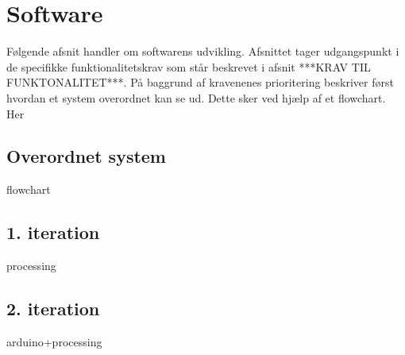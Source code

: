 \chapter{Software}
\label{software}
Følgende afsnit handler om softwarens udvikling. Afsnittet tager udgangspunkt i de specifikke funktionalitetskrav som står beskrevet i afsnit ***KRAV TIL FUNKTONALITET***. På baggrund af kravenenes prioritering beskriver først hvordan et system overordnet kan se ud. Dette sker ved hjælp af et flowchart. Her  

\section{Overordnet system}
flowchart

\section{1. iteration}
processing

\section{2. iteration}
arduino+processing 